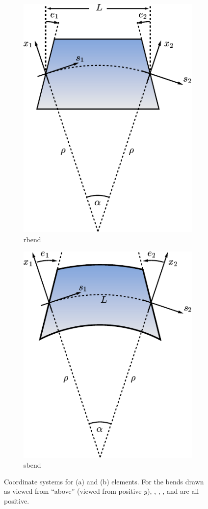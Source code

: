 \begin{figure}[tb]
  \centering
  \hfill
  \begin{subfigure}[b]{0.45\textwidth}
    \includegraphics{rbend-coords.pdf}
    \caption{rbend}
    \label{f:bend.rbend}
  \end{subfigure}
  \hfill
  \begin{subfigure}[b]{0.45\textwidth}
    \includegraphics{sbend-coords.pdf}
    \caption{sbend}
    \label{f:bend.sbend}
  \end{subfigure}
  \hfill
  \caption[Coordinate systems for (a) \ and (b) \ elements.]
{Coordinate systems for (a)  and (b)  elements.
For the bends drawn as viewed from ``above'' (viewed from positive $y$),
, , ,  and  are all positive.}
  \label{f:bend}
\end{figure}

